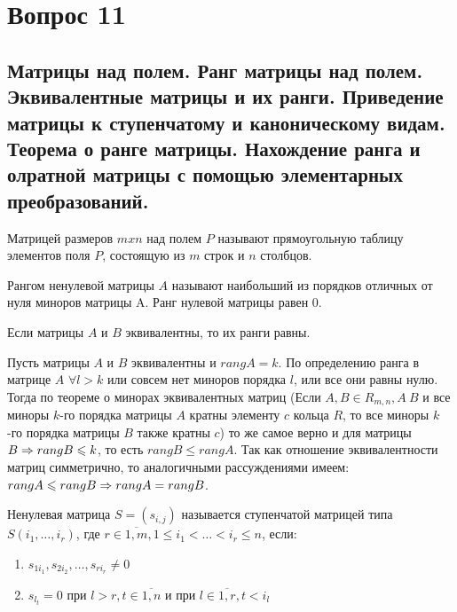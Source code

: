 \section{Вопрос 11}

\subsection{Матрицы над полем. Ранг матрицы над полем.
Эквивалентные матрицы и их ранги.
Приведение матрицы к ступенчатому и каноническому видам.
Теорема о ранге матрицы.
Нахождение ранга и олратной матрицы с помощью элементарных преобразований.}

\begin{DEF}
  Матрицей размеров $mxn$ над полем $P$ называют прямоугольную таблицу
  элементов поля $P$, состоящую из $m$ строк и $n$ столбцов.
\end{DEF}

\begin{DEF}
  Рангом ненулевой матрицы  $A$ называют
  наибольший из порядков отличных от нуля миноров матрицы A.
  Ранг нулевой матрицы равен 0.
\end{DEF}

\begin{proofs}
	Если матрицы $A$ и $B$ эквивалентны, то их ранги равны.
	\begin{dokvo}
    Пусть матрицы $A$ и $B$ эквивалентны и $rang A = k$.
    По определению ранга в матрице $A$ $\forall l > k$ или совсем нет миноров порядка $l$, или все они равны нулю.
    Тогда по теореме о минорах эквивалентных матриц (Если $A,B \in R_{m,n}, A~B$ и все миноры $k$-го порядка матрицы $A$ кратны элементу $c$
    кольца $R$, то все миноры $k$-го порядка матрицы $B$ также кратны $c$) то же самое верно и для матрицы $B \Rightarrow rang B \leqslant k$, то есть $rang B \leqslant rang A$.
    Так как отношение эквивалентности матриц симметрично, то аналогичными рассуждениями имеем: $rang A \leqslant rang B \Rightarrow rang A = rang B$.
	\end{dokvo}
\end{proofs}

\begin{DEF}
  Ненулевая матрица $S=(s_{i,j})$ называется ступенчатой матрицей типа $S(i_1, \ldots, i_r)$,
  где $r \in \overline{1,m}, 1 \leqslant i_1 < \ldots < i_r \leqslant n$, если:
  \begin{enumerate}
  	\item $s_{1i_1}, s_{2i_2}, \ldots, s_{ri_r} \neq 0$
  	\item $s_{l_t} = 0$ при $l > r, t \in \overline{1,n}$ и при $l \in \overline{1,r}, t < i_l$
  \end{enumerate}
\end{DEF}

